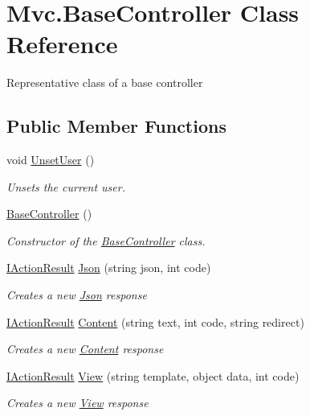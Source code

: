\hypertarget{class_mvc_1_1_base_controller}{}\section{Mvc.\+Base\+Controller Class Reference}
\label{class_mvc_1_1_base_controller}


Representative class of a base controller  


\subsection*{Public Member Functions}
\begin{DoxyCompactItemize}
\item 
void \hyperlink{class_mvc_1_1_base_controller_ae29f489a7f1a4829301aac4c4f762d1d}{Unset\+User} ()
\begin{DoxyCompactList}\small\item\em Unsets the current user. \end{DoxyCompactList}\item 
\hyperlink{class_mvc_1_1_base_controller_a5d30ca8bf9e277187b8212fb6b8a8428}{Base\+Controller} ()
\begin{DoxyCompactList}\small\item\em Constructor of the \hyperlink{class_mvc_1_1_base_controller}{Base\+Controller} class. \end{DoxyCompactList}\item 
\hyperlink{interface_mvc_1_1_i_action_result}{I\+Action\+Result} \hyperlink{class_mvc_1_1_base_controller_ac13791a92c035d9c60d7193676e88c2c}{Json} (string json, int code)
\begin{DoxyCompactList}\small\item\em Creates a new \hyperlink{class_mvc_1_1_json}{Json} response \end{DoxyCompactList}\item 
\hyperlink{interface_mvc_1_1_i_action_result}{I\+Action\+Result} \hyperlink{class_mvc_1_1_base_controller_a391c25d6786a328c92aa81a786786a21}{Content} (string text, int code, string redirect)
\begin{DoxyCompactList}\small\item\em Creates a new \hyperlink{class_mvc_1_1_content}{Content} response \end{DoxyCompactList}\item 
\hyperlink{interface_mvc_1_1_i_action_result}{I\+Action\+Result} \hyperlink{class_mvc_1_1_base_controller_a572c7ba4224b5596962be6cd6311fe50}{View} (string template, object data, int code)
\begin{DoxyCompactList}\small\item\em Creates a new \hyperlink{class_mvc_1_1_view}{View} response \end{DoxyCompactList}\end{DoxyCompactItemize}
